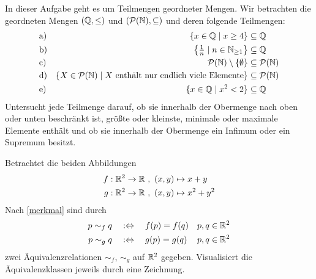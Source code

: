 \begin{aufg}[Schranken]
    In dieser Aufgabe geht es um Teilmengen geordneter Mengen. Wir betrachten die geordneten Mengen $(\mathbb Q,\le)$ und $(\mathcal P(\mathbb N),\subseteq)$ und deren folgende Teilmengen:
    \begin{align*}
        & \text{a)} & \{x\in \mathbb Q \mid x\ge 4\} & \subseteq \mathbb Q \\
        & \text{b)} & \left\{\tfrac{1}{n}\mid n\in \mathbb N_{\ge 1}\right\} & \subseteq \mathbb Q \\
        & \text{c)} & \mathcal P(\mathbb N)\setminus \{\emptyset\} & \subseteq \mathcal P(\mathbb N) \\
        & \text{d)} & \{X\in\mathcal P(\mathbb N)\mid X\ \text{enthält nur endlich viele Elemente}\} & \subseteq \mathcal P(\mathbb N) \\
        & \text{e)} & \{x\in \mathbb Q \mid x^2<2\} & \subseteq \mathbb Q
    \end{align*}
    Untersucht jede Teilmenge darauf, ob sie innerhalb der Obermenge nach oben oder unten beschränkt ist, größte oder kleinste, minimale oder maximale Elemente enthält und ob sie innerhalb der Obermenge ein Infimum oder ein Supremum besitzt.
\end{aufg}


\begin{aufg}[Äquivalenzklassen]
    Betrachtet die beiden Abbildungen
    \begin{align*}
        f : \mathbb R^2 \to \mathbb R \ &,\ (x,y) \mapsto x+y \\
        g : \mathbb R^2 \to \mathbb R \ &,\ (x,y) \mapsto x^2+y^2
    \end{align*}
    Nach \cref{merkmal} sind durch
    \begin{align*}
        p\sim_f q \quad &:\Leftrightarrow\quad f(p)=f(q) && p,q\in \mathbb R^2 \\
        p\sim_g q \quad &:\Leftrightarrow\quad g(p)=g(q) && p,q\in \mathbb R^2
    \end{align*}
    zwei Äquivalenzrelationen $\sim_f$, $\sim_g$ auf $\mathbb R^2$ gegeben. Visualisiert die Äquivalenzklassen jeweils durch eine Zeichnung.
\end{aufg}

